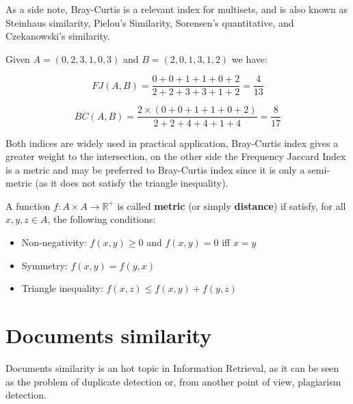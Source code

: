 As a side note, Bray-Curtis is a relevant index for multisets, and is also known as Steinhaus similarity, Pielou's Similarity, Sorensen's quantitative, and Czekanowski's similarity.\cite{legendre1998numerical}

\begin{esempio}
	Given $A = (0, 2, 3, 1, 0, 3) $ and $B = (2, 0, 1, 3, 1, 2)$ we have:
	
	\begin{equation}
	FJ(A,B) = \frac{0 + 0 + 1 + 1 + 0 + 2}{2 + 2 + 3 + 3 + 1 + 2} = \frac{4}{13} 
	\end{equation}
	
	\begin{equation}
	BC(A,B) = \frac{2 \times (0 + 0 + 1 + 1 + 0 + 2) }{2 + 2 + 4 + 4 + 1 + 4} = \frac{8}{17}
	\end{equation}
\end{esempio}

Both indices are widely used in practical application, Bray-Curtis index gives a greater weight to the intersection, on the other side the Frequency Jaccard Index is a metric and may be preferred to Bray-Curtis index since it is only a semi-metric (as it does not satisfy the triangle inequality). 

\begin{definizione}
	A function $f : A \times A \rightarrow \mathbb{R}^{+} $ is called \textbf{metric} (or simply \textbf{distance}) if satisfy, for all $x, y, z \in A$, the following conditions:
	\begin{itemize}
		\item Non-negativity: $f(x,y) \geq 0$ and $f(x,y) = 0$ iff $x = y$
		\item Symmetry: $f(x, y) = f(y, x)$
		\item Triangle inequality: $f(x, z) \leq f(x, y) + f(y, z)$
	\end{itemize}
\end{definizione}

\section{Documents similarity}

Documents similarity is an hot topic in Information Retrieval, as it can be seen as the problem of duplicate detection\cite{Broder2000} or, from another point of view, plagiarism detection.\\

